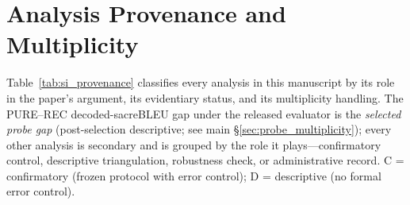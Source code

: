 \documentclass[pdflatex,sn-chicago]{sn-jnl}
\begin{document}
\section{Analysis Provenance and Multiplicity}
\label{sec:provenance}
Table~\ref{tab:si_provenance} classifies every analysis in this manuscript by its role in the paper's argument, its evidentiary status, and its multiplicity handling. The PURE--REC decoded-sacreBLEU gap under the released evaluator is the \emph{selected probe gap} (post-selection descriptive; see main \S\ref{sec:probe_multiplicity}); every other analysis is secondary and is grouped by the role it plays---confirmatory control, descriptive triangulation, robustness check, or administrative record. C = confirmatory (frozen protocol with error control); D = descriptive (no formal error control).
\end{document}
